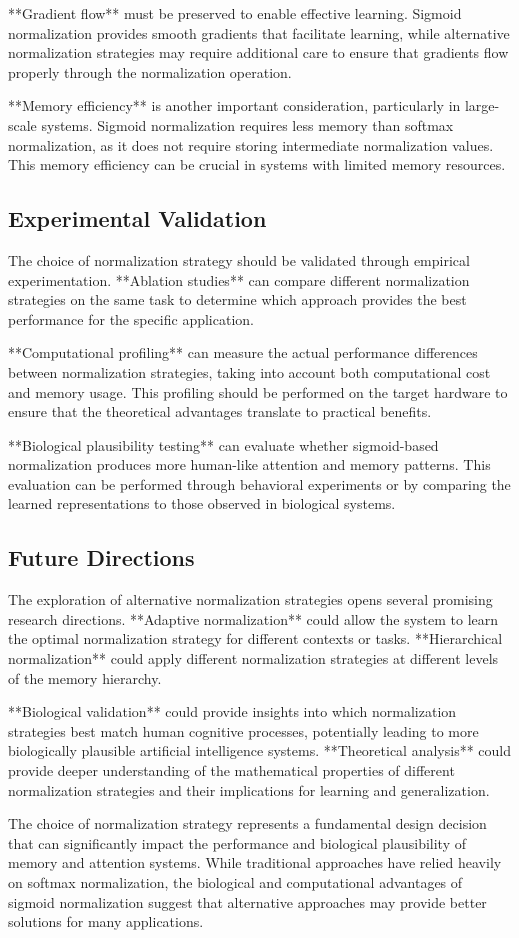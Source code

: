 \documentclass{article}
\begin{document}
**Gradient flow** must be preserved to enable effective learning. Sigmoid normalization provides smooth gradients that facilitate learning, while alternative normalization strategies may require additional care to ensure that gradients flow properly through the normalization operation.

**Memory efficiency** is another important consideration, particularly in large-scale systems. Sigmoid normalization requires less memory than softmax normalization, as it does not require storing intermediate normalization values. This memory efficiency can be crucial in systems with limited memory resources.

\subsection{Experimental Validation}

The choice of normalization strategy should be validated through empirical experimentation. **Ablation studies** can compare different normalization strategies on the same task to determine which approach provides the best performance for the specific application.

**Computational profiling** can measure the actual performance differences between normalization strategies, taking into account both computational cost and memory usage. This profiling should be performed on the target hardware to ensure that the theoretical advantages translate to practical benefits.

**Biological plausibility testing** can evaluate whether sigmoid-based normalization produces more human-like attention and memory patterns. This evaluation can be performed through behavioral experiments or by comparing the learned representations to those observed in biological systems.

\subsection{Future Directions}

The exploration of alternative normalization strategies opens several promising research directions. **Adaptive normalization** could allow the system to learn the optimal normalization strategy for different contexts or tasks. **Hierarchical normalization** could apply different normalization strategies at different levels of the memory hierarchy.

**Biological validation** could provide insights into which normalization strategies best match human cognitive processes, potentially leading to more biologically plausible artificial intelligence systems. **Theoretical analysis** could provide deeper understanding of the mathematical properties of different normalization strategies and their implications for learning and generalization.

The choice of normalization strategy represents a fundamental design decision that can significantly impact the performance and biological plausibility of memory and attention systems. While traditional approaches have relied heavily on softmax normalization, the biological and computational advantages of sigmoid normalization suggest that alternative approaches may provide better solutions for many applications.
\end{document}
